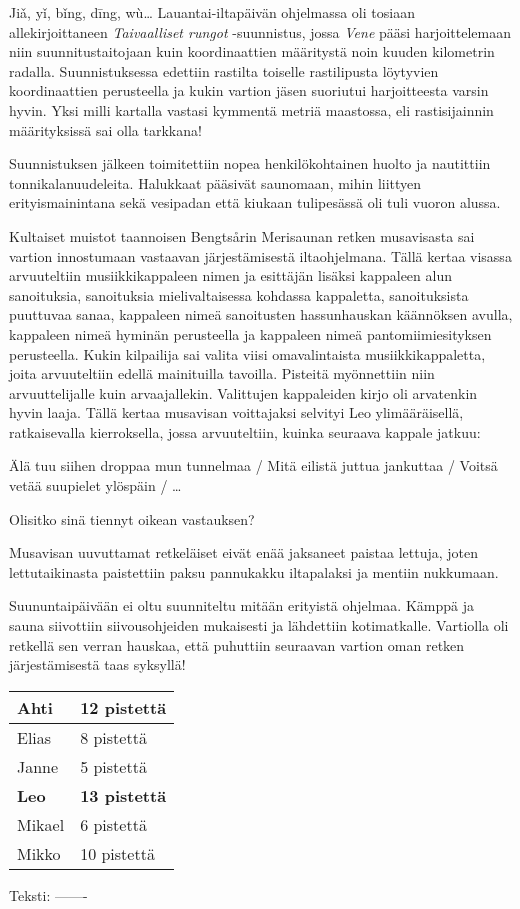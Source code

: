 \begin{multicols}{2}
Jiǎ, yǐ, bǐng, dīng, wù… Lauantai-iltapäivän ohjelmassa oli tosiaan allekirjoittaneen \textit{Taivaalliset rungot} -suunnistus, jossa \textit{Vene} pääsi harjoittelemaan niin suunnitustaitojaan kuin koordinaattien määritystä noin kuuden kilometrin radalla. Suunnistuksessa edettiin rastilta toiselle rastilipusta löytyvien koordinaattien perusteella ja kukin vartion jäsen suoriutui harjoitteesta varsin hyvin. Yksi milli kartalla vastasi kymmentä metriä maastossa, eli rastisijainnin määrityksissä sai olla tarkkana!

Suunnistuksen jälkeen toimitettiin nopea henkilökohtainen huolto ja nautittiin tonnikalanuudeleita. Halukkaat pääsivät saunomaan, mihin liittyen erityismainintana sekä vesipadan että kiukaan tulipesässä oli tuli vuoron alussa.

Kultaiset muistot taannoisen Bengtsårin Merisaunan retken musavisasta sai vartion innostumaan vastaavan järjestämisestä iltaohjelmana. Tällä kertaa visassa arvuuteltiin musiikkikappaleen nimen ja esittäjän lisäksi kappaleen alun sanoituksia, sanoituksia mielivaltaisessa kohdassa kappaletta, sanoituksista puuttuvaa sanaa, kappaleen nimeä sanoitusten hassunhauskan käännöksen avulla, kappaleen nimeä hyminän perusteella ja kappaleen nimeä pantomiimiesityksen perusteella. Kukin kilpailija sai valita viisi omavalintaista musiikkikappaletta, joita arvuuteltiin edellä mainituilla tavoilla. Pisteitä myönnettiin niin arvuuttelijalle kuin arvaajallekin. Valittujen kappaleiden kirjo oli arvatenkin hyvin laaja. Tällä kertaa musavisan voittajaksi selvityi Leo ylimääräisellä, ratkaisevalla kierroksella, jossa arvuuteltiin, kuinka seuraava kappale jatkuu: 

Älä tuu siihen droppaa mun tunnelmaa / Mitä eilistä juttua jankuttaa / Voitsä vetää suupielet ylöspäin / …

Olisitko sinä tiennyt oikean vastauksen?

Musavisan uuvuttamat retkeläiset eivät enää jaksaneet paistaa lettuja, joten lettutaikinasta paistettiin paksu pannukakku iltapalaksi ja mentiin nukkumaan.

Suununtaipäivään ei oltu suunniteltu mitään erityistä ohjelmaa. Kämppä ja sauna siivottiin siivousohjeiden mukaisesti ja lähdettiin kotimatkalle. Vartiolla oli retkellä sen verran hauskaa, että puhuttiin seuraavan vartion oman retken järjestämisestä taas syksyllä!


\begin{center}
\begin{tabular}{ |l|l| }
	\hline
	Ahti & 12 pistettä \\
	\hline
	Elias & 8 pistettä \\
	\hline
	Janne & 5 pistettä \\
	\hline
	\textbf{Leo} & \textbf{13 pistettä} \\
	\hline
	Mikael & 6 pistettä \\
	\hline
	Mikko & 10 pistettä \\
	\hline
\end{tabular}
\end{center}


{\raggedleft Teksti: -------\\}

\end{multicols}

